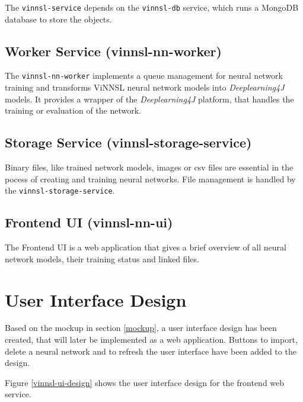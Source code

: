 The \texttt{vinnsl-service} depends on the \texttt{vinnsl-db} service,
which runs a MongoDB database to store the objects.

\subsection{Worker Service
(vinnsl-nn-worker)}\label{worker-service-vinnsl-nn-worker}

The \texttt{vinnsl-nn-worker} implements a queue management for neural
network training and transforms ViNNSL neural network models into
\emph{Deeplearning4J} models. It provides a wrapper of the
\emph{Deeplearning4J} platform, that handles the training or evaluation
of the network.

\subsection{Storage Service
(vinnsl-storage-service)}\label{storage-service-vinnsl-storage-service}

Binary files, like trained network models, images or csv files are
essential in the pocess of creating and training neural networks. File
management is handled by the \texttt{vinnsl-storage-service}.

\subsection{Frontend UI (vinnsl-nn-ui)}\label{frontend-ui-vinnsl-nn-ui}

The Frontend UI is a web application that gives a brief overview of all
neural network models, their training status and linked files.

\section{User Interface Design}\label{user-interface-design}

Based on the mockup in section \ref{mockup}, a user interface design has
been created, that will later be implemented as a web application.
Buttons to import, delete a neural network and to refresh the user
interface have been added to the design.

Figure \ref{vinnsl-ui-design} shows the user interface design for the
frontend web service.

